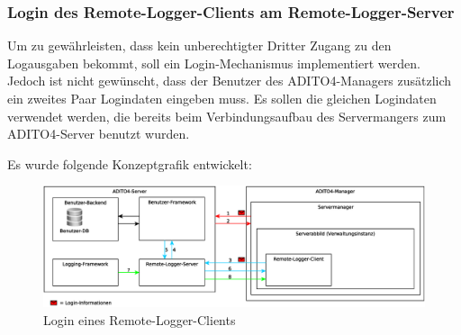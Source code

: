 \newpage

\subsubsection{Login des Remote-Logger-Clients am Remote-Logger-Server}
\par Um zu gewährleisten, dass kein unberechtigter Dritter Zugang zu den Logausgaben bekommt, soll ein Login-Mechanismus implementiert werden. Jedoch ist nicht gewünscht, dass der Benutzer des ADITO4-Managers zusätzlich ein zweites Paar Logindaten eingeben muss. Es sollen die gleichen Logindaten verwendet werden, die bereits beim Verbindungsaufbau des Servermangers zum ADITO4-Server benutzt wurden.

\par Es wurde folgende Konzeptgrafik entwickelt:
\begin{figure}[h]
	\vspace{-5px}
	\centering
	\includegraphics[width=\textwidth]{../img/Kommunikation-ADITO-Server-Manager-Remote-Logger.eps}
	\caption{Login eines Remote-Logger-Clients}
	\label{fig:KommunikationServerManager}
\end{figure}
\vspace{-10px}
